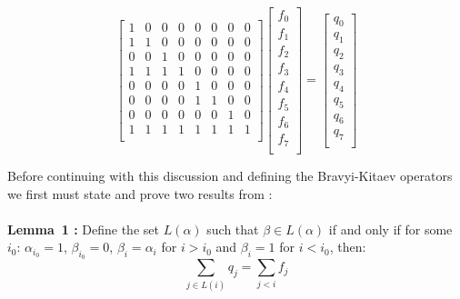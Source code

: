 \documentclass[twoside]{article}
\begin{document}
\begin{equation}        
        \begin{bmatrix}
                1 & 0 & 0 & 0 & 0 & 0 & 0 & 0 \\
                1 & 1 & 0 & 0 & 0 & 0 & 0 & 0 \\
                0 & 0 & 1 & 0 & 0 & 0 & 0 & 0 \\
                1 & 1 & 1 & 1 & 0 & 0 & 0 & 0 \\
                0 & 0 & 0 & 0 & 1 & 0 & 0 & 0 \\
                0 & 0 & 0 & 0 & 1 & 1 & 0 & 0 \\
                0 & 0 & 0 & 0 & 0 & 0 & 1 & 0 \\
                1 & 1 & 1 & 1 & 1 & 1 & 1 & 1 \\
        \end{bmatrix}        
        \begin{bmatrix}
                f_0 \\
                f_1 \\
                f_2 \\
                f_3 \\
                f_4 \\
                f_5 \\
                f_6 \\
                f_7 \\
        \end{bmatrix}
        = \begin{bmatrix}
                q_0 \\
                q_1 \\
                q_2 \\
                q_3 \\
                q_4 \\
                q_5 \\
                q_6 \\
                q_7 \\
        \end{bmatrix}
\end{equation}

\vspace*{12pt}
\noindent
Before continuing with this discussion and defining the Bravyi-Kitaev operators we first must state and prove two results from \cite{bravyikitaev}:\\\\
{\bf Lemma~1 \cite{bravyikitaev}:} Define the set $L(\alpha)$ such that $\beta \in L(\alpha)$ if and only if for some $i_0$: $\alpha_{i_0} = 1$, $\beta_{i_0} = 0$, $\beta_i = \alpha_i$ for $i> i_0$ and $\beta_i = 1$ for $i< i_0$, then:
\begin{equation}
        \sum_{j \in L(i)} q_j = \sum_{j < i} f_j
\end{equation}
\vspace*{12pt}
\end{document}
